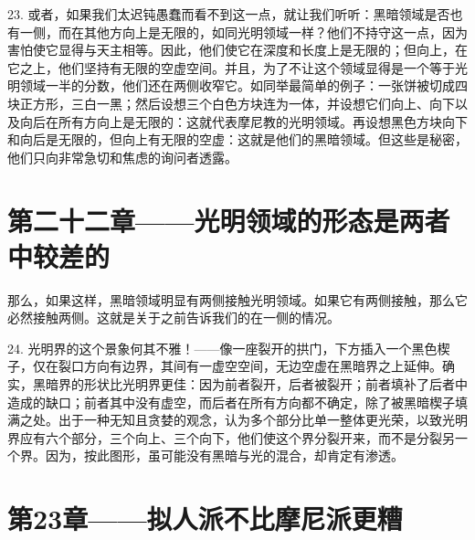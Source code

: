 23. 或者，如果我们太迟钝愚蠢而看不到这一点，就让我们听听：黑暗领域是否也有一侧，而在其他方向上是无限的，如同光明领域一样？他们不持守这一点，因为害怕使它显得与天主相等。因此，他们使它在深度和长度上是无限的；但向上，在它之上，他们坚持有无限的空虚空间。并且，为了不让这个领域显得是一个等于光明领域一半的分数，他们还在两侧收窄它。如同举最简单的例子：一张饼被切成四块正方形，三白一黑；然后设想三个白色方块连为一体，并设想它们向上、向下以及向后在所有方向上是无限的：这就代表摩尼教的光明领域。再设想黑色方块向下和向后是无限的，但向上有无限的空虚：这就是他们的黑暗领域。但这些是秘密，他们只向非常急切和焦虑的询问者透露。\par


\section{第二十二章——光明领域的形态是两者中较差的}

那么，如果这样，黑暗领域明显有两侧接触光明领域。如果它有两侧接触，那么它必然接触两侧。这就是关于之前告诉我们的在一侧的情况。\par

24. 光明界的这个景象何其不雅！——像一座裂开的拱门，下方插入一个黑色楔子，仅在裂口方向有边界，其间有一虚空空间，无边空虚在黑暗界之上延伸。确实，黑暗界的形状比光明界更佳：因为前者裂开，后者被裂开；前者填补了后者中造成的缺口；前者其中没有虚空，而后者在所有方向都不确定，除了被黑暗楔子填满之处。出于一种无知且贪婪的观念，认为多个部分比单一整体更光荣，以致光明界应有六个部分，三个向上、三个向下，他们使这个界分裂开来，而不是分裂另一个界。因为，按此图形，虽可能没有黑暗与光的混合，却肯定有渗透。\par


\section{第23章——拟人派不比摩尼派更糟}

